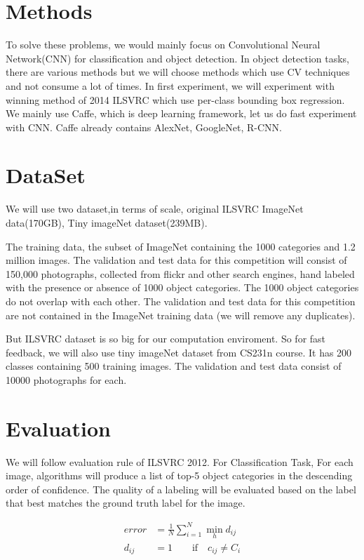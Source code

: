 \documentclass[10pt,twocolumn,letterpaper]{article}
\begin{document}
\section{Methods}

To solve these problems, we would mainly focus on Convolutional Neural Network(CNN) for classification and object detection.
In object detection tasks, there are various methods but we will choose methods which use CV techniques and not consume a lot of times.
In first experiment, we will experiment with winning method of 2014 ILSVRC which use per-class bounding box regression.
We mainly use Caffe, which is deep learning framework, let us do fast experiment with CNN.
Caffe already contains AlexNet, GoogleNet, R-CNN.

\section{DataSet}

We will use two dataset,in terms of scale, original ILSVRC ImageNet data(170GB), Tiny imageNet dataset(239MB).

The training data, the subset of ImageNet containing the 1000 categories and 1.2 million images.
The validation and test data for this competition will consist of 150,000 photographs, collected from flickr and other search engines, hand labeled with the presence or absence of 1000 object categories.
The 1000 object categories do not overlap with each other.
The validation and test data for this competition are not contained in the ImageNet training data (we will remove any duplicates).

But ILSVRC dataset is so big for our computation enviroment.
So for fast feedback, we will also use tiny imageNet dataset from CS231n course.
It has 200 classes containing 500 training images.
The validation and test data consist of 10000 photographs for each.

\section{Evaluation}

We will follow evaluation rule of ILSVRC 2012.
For Classification Task, For each image, algorithms will produce a list of top-5 object categories in the descending order of confidence.
The quality of a labeling will be evaluated based on the label that best matches the ground truth label for the image.

\begin{align*}
error &= \frac {1} {N} \sum_{i=1}^{N} {\min_{h} {d_{ij}}} \\
d_{ij} &= 1 \quad\quad \text{if}\quad c_{ij} \neq C_i \\
\end{align*}
\end{document}
